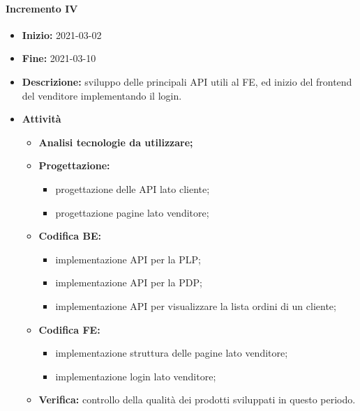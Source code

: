 \paragraph[Incremento IV]{Incremento IV}
\begin{itemize}
    \item [] \textbf{Inizio:} 2021-03-02
    \item [] \textbf{Fine:} 2021-03-10
    \item [] \textbf{Descrizione:} sviluppo delle principali API utili al FE, ed inizio del frontend del venditore implementando il login.
    \item [] \textbf{Attività}
          \begin{itemize}
              \item \textbf{Analisi tecnologie da utilizzare;}
              \item \textbf{Progettazione:}
                    \begin{itemize}
                        \item progettazione delle API lato cliente;
                        \item progettazione pagine lato venditore;
                    \end{itemize}
              \item \textbf{Codifica BE:}
                    \begin{itemize}
                        \item implementazione API per la PLP;
                        \item implementazione API per la PDP;
                        \item implementazione API per visualizzare la lista ordini di un cliente;
                    \end{itemize}
              \item \textbf{Codifica FE:}
                    \begin{itemize}
                        \item implementazione struttura delle pagine lato venditore;
                        \item implementazione login lato venditore;
                    \end{itemize}
              \item \textbf{Verifica:} controllo della qualità dei prodotti sviluppati in questo periodo.
          \end{itemize}
\end{itemize}

